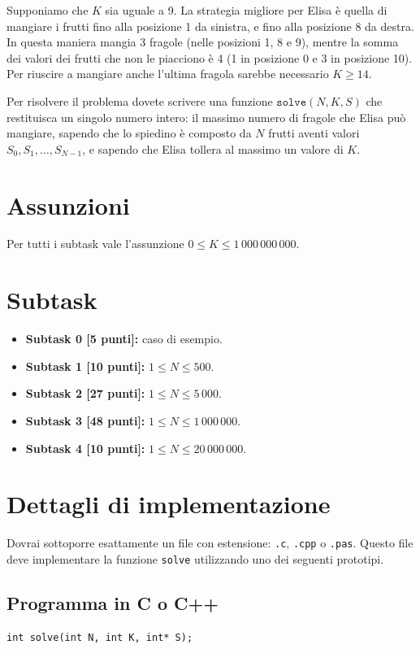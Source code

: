 \documentclass[a4paper,11pt]{article}
\begin{document}
Supponiamo che $K$ sia uguale a 9. La strategia
migliore per Elisa è quella di mangiare i frutti fino alla posizione 1
da sinistra, e fino alla posizione 8 da destra. In questa maniera mangia
3 fragole (nelle posizioni 1, 8 e 9), mentre la somma dei valori dei
frutti che non le piacciono è 4 (1 in posizione 0 e 3
in posizione 10). Per riuscire a mangiare anche l'ultima fragola
sarebbe necessario $K \ge 14$.

Per risolvere il problema dovete scrivere una funzione
$\texttt{solve} (N, K, S)$ che restituisca un singolo numero intero:
il massimo numero di fragole che Elisa può mangiare, sapendo che lo
spiedino è composto da $N$ frutti aventi valori $S_0, S_1, \dots,
S_{N-1}$, e sapendo che Elisa tollera al massimo un valore di $K$.

\section*{Assunzioni}
Per tutti i subtask vale l'assunzione $0 \le K \le 1\,000\,000\,000$.

\section*{Subtask}
\begin{itemize}
\item \textbf{Subtask 0 \phantom{1}[5 punti]:} caso di esempio.
\item \textbf{Subtask 1 [10 punti]:} $1 \le N \le 500$.
\item \textbf{Subtask 2 [27 punti]:} $1 \le N \le 5\,000$.
\item \textbf{Subtask 3 [48 punti]:} $1 \le N \le 1\,000\,000$.
\item \textbf{Subtask 4 [10 punti]:} $1 \le N \le 20\,000\,000$.
\end{itemize}


\section*{Dettagli di implementazione}
Dovrai sottoporre esattamente un file con estensione: \texttt{.c},
\texttt{.cpp} o \texttt{.pas}. Questo file deve implementare la
funzione \texttt{solve} utilizzando uno dei seguenti
prototipi.

\subsection*{Programma in C o C++}
\begin{verbatim}
int solve(int N, int K, int* S);
\end{verbatim}
\end{document}
